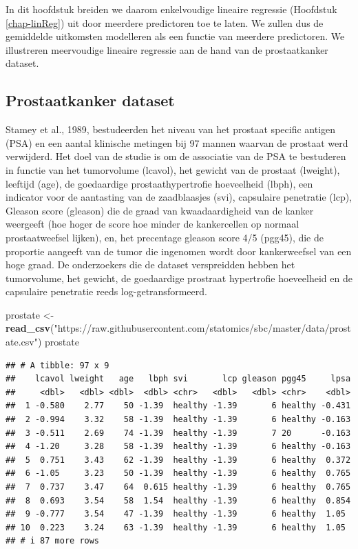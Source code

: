\documentclass[
  12pt,dutch]{book}
\newenvironment{Shaded}{\begin{snugshade}}{\end{snugshade}}
\newcommand{\FunctionTok}[1]{\textcolor[rgb]{0.13,0.29,0.53}{\textbf{#1}}}
\newcommand{\NormalTok}[1]{#1}
\newcommand{\OtherTok}[1]{\textcolor[rgb]{0.56,0.35,0.01}{#1}}
\newcommand{\StringTok}[1]{\textcolor[rgb]{0.31,0.60,0.02}{#1}}
\theoremstyle{definition}
\theoremstyle{definition}
\theoremstyle{definition}
\theoremstyle{definition}
\theoremstyle{remark}
\begin{document}
In dit hoofdstuk breiden we daarom enkelvoudige lineaire regressie (Hoofdstuk \ref{chap-linReg}) uit door meerdere predictoren toe te laten. We zullen dus de gemiddelde uitkomsten modelleren als een functie van meerdere predictoren.
We illustreren meervoudige lineaire regressie aan de hand van de prostaatkanker dataset.

\subsection{Prostaatkanker dataset}\label{sec:prostate}

Stamey et al., 1989, bestudeerden het niveau van het prostaat specific antigen (PSA) en een aantal klinische metingen bij 97 mannen waarvan de prostaat werd verwijderd.
Het doel van de studie is om de associatie van de PSA te bestuderen in functie van het tumorvolume (lcavol), het gewicht van de prostaat (lweight), leeftijd (age), de goedaardige prostaathypertrofie hoeveelheid (lbph), een indicator voor de aantasting van de zaadblaasjes (svi), capsulaire penetratie (lcp), Gleason score (gleason) die de graad van kwaadaardigheid van de kanker weergeeft (hoe hoger de score hoe minder de kankercellen op normaal prostaatweefsel lijken), en, het precentage gleason score 4/5 (pgg45), die de proportie aangeeft van de tumor die ingenomen wordt door kankerweefsel van een hoge graad. De onderzoekers die de dataset verspreidden hebben het tumorvolume, het gewicht, de goedaardige prostraat hypertrofie hoeveelheid en de capsulaire penetratie reeds log-getransformeerd.

\begin{Shaded}
\begin{Highlighting}[]
\NormalTok{prostate }\OtherTok{\textless{}{-}} \FunctionTok{read\_csv}\NormalTok{(}\StringTok{"https://raw.githubusercontent.com/statomics/sbc/master/data/prostate.csv"}\NormalTok{)}
\NormalTok{prostate}
\end{Highlighting}
\end{Shaded}

\begin{verbatim}
## # A tibble: 97 x 9
##    lcavol lweight   age   lbph svi       lcp gleason pgg45     lpsa
##     <dbl>   <dbl> <dbl>  <dbl> <chr>   <dbl>   <dbl> <chr>    <dbl>
##  1 -0.580    2.77    50 -1.39  healthy -1.39       6 healthy -0.431
##  2 -0.994    3.32    58 -1.39  healthy -1.39       6 healthy -0.163
##  3 -0.511    2.69    74 -1.39  healthy -1.39       7 20      -0.163
##  4 -1.20     3.28    58 -1.39  healthy -1.39       6 healthy -0.163
##  5  0.751    3.43    62 -1.39  healthy -1.39       6 healthy  0.372
##  6 -1.05     3.23    50 -1.39  healthy -1.39       6 healthy  0.765
##  7  0.737    3.47    64  0.615 healthy -1.39       6 healthy  0.765
##  8  0.693    3.54    58  1.54  healthy -1.39       6 healthy  0.854
##  9 -0.777    3.54    47 -1.39  healthy -1.39       6 healthy  1.05 
## 10  0.223    3.24    63 -1.39  healthy -1.39       6 healthy  1.05 
## # i 87 more rows
\end{verbatim}
\end{document}
